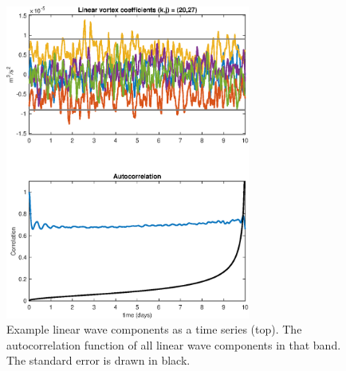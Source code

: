 \documentclass[10pt]{article}
\begin{document}
\begin{figure}[t]
  \centerline{\includegraphics[width=19pc,angle=0]{figures/Autocorrelation_k_20_j_27}}
  \caption{Example linear wave components as a time series (top). The autocorrelation function of all linear wave components in that band. The standard error is drawn in black.}
  \label{Autocorrelation_k_20_j_27}
\end{figure}
\end{document}
